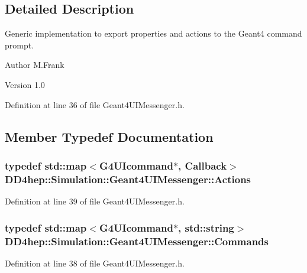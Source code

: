 \subsection{Detailed Description}
Generic implementation to export properties and actions to the Geant4 command prompt. \begin{DoxyAuthor}{Author}
M.Frank 
\end{DoxyAuthor}
\begin{DoxyVersion}{Version}
1.0 
\end{DoxyVersion}


Definition at line 36 of file Geant4UIMessenger.h.

\subsection{Member Typedef Documentation}
\hypertarget{class_d_d4hep_1_1_simulation_1_1_geant4_u_i_messenger_a91b01eab1bb56af8661d2c99660211cd}{
\subsubsection[{Actions}]{\setlength{\rightskip}{0pt plus 5cm}typedef std::map$<$G4UIcommand$\ast$, {\bf Callback}$>$ {\bf DD4hep::Simulation::Geant4UIMessenger::Actions}}}
\label{class_d_d4hep_1_1_simulation_1_1_geant4_u_i_messenger_a91b01eab1bb56af8661d2c99660211cd}


Definition at line 39 of file Geant4UIMessenger.h.\hypertarget{class_d_d4hep_1_1_simulation_1_1_geant4_u_i_messenger_a07e66059e5542ef6c393fda188f44907}{
\subsubsection[{Commands}]{\setlength{\rightskip}{0pt plus 5cm}typedef std::map$<$G4UIcommand$\ast$, std::string$>$ {\bf DD4hep::Simulation::Geant4UIMessenger::Commands}}}
\label{class_d_d4hep_1_1_simulation_1_1_geant4_u_i_messenger_a07e66059e5542ef6c393fda188f44907}


Definition at line 38 of file Geant4UIMessenger.h.


